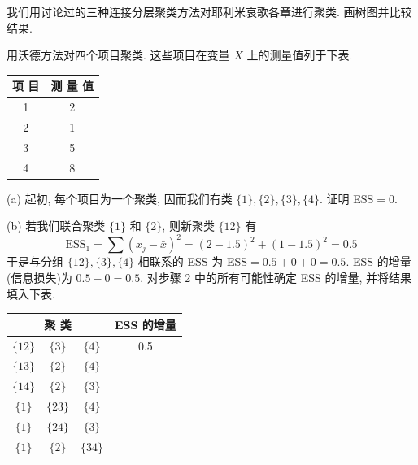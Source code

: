 我们用讨论过的三种连接分层聚类方法对耶利米哀歌各章进行聚类. 画树图并比较结果.

\quad 用沃德方法对四个项目聚类. 这些项目在变量 $X$ 上的测量值列于下表.

\begin{mvtable}
\setlength{\tabcolsep}{8pt}%
\begin{tabular}{c|c}
\toprule
\textbf{项 目} & \textbf{测 量 值} \\
\midrule
1 & 2 \\
2 & 1 \\
3 & 5 \\
4 & 8 \\
\bottomrule
\end{tabular}
\end{mvtable}

\noindent (a) 起初, 每个项目为一个聚类, 因而我们有类 $\{1\},\{2\},\{3\},\{4\}$. 证明 ESS$=0$.

\noindent (b) 若我们联合聚类 $\{1\}$ 和 $\{2\}$, 则新聚类 $\{12\}$ 有
\[
\mathrm{ESS}_1=\sum(x_j-\bar{x})^2=(2-1.5)^2+(1-1.5)^2=0.5
\]
于是与分组 $\{12\},\{3\},\{4\}$ 相联系的 ESS 为 ESS$=0.5+0+0=0.5$. ESS 的增量(信息损失)为 $0.5-0=0.5$. 对步骤 2 中的所有可能性确定 ESS 的增量, 并将结果填入下表.

\begin{mvtable}
\setlength{\tabcolsep}{10pt}%
\begin{tabular}{ccc|c}
\toprule
\multicolumn{3}{c|}{\textbf{聚 类}} & \textbf{ESS 的增量} \\
\midrule
$\{12\}$ & $\{3\}$ & $\{4\}$ & 0.5 \\
$\{13\}$ & $\{2\}$ & $\{4\}$ & \\
$\{14\}$ & $\{2\}$ & $\{3\}$ & \\
$\{1\}$ & $\{23\}$ & $\{4\}$ & \\
$\{1\}$ & $\{24\}$ & $\{3\}$ & \\
$\{1\}$ & $\{2\}$ & $\{34\}$ & \\
\bottomrule
\end{tabular}
\end{mvtable}
